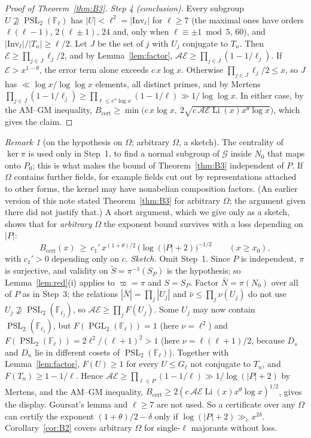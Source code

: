 \documentclass[11pt]{amsart}
\theoremstyle{definition}
\theoremstyle{remark}
\newtheorem{remark}[theorem]{Remark}
\newcommand{\F}{\mathbb{F}}
\DeclareMathOperator{\PGL}{PGL}
\DeclareMathOperator{\PSL}{PSL}
\DeclareMathOperator{\Li}{Li}
\newcommand{\Inv}{\mathrm{Inv}}
\newcommand{\cA}{\mathcal{A}}      %
\newcommand{\cE}{\mathcal{E}}      %
\newcommand{\cG}{\mathcal{G}}      %
\begin{document}
\begin{proof}[Proof of Theorem~\ref{thm:B3}]
\emph{Step 4 (conclusion).} Every subgroup $U\not\supseteq\PSL_2(\F_\ell)$ has $|U|<\ell^2=|\Inv_\ell|$ for $\ell\ge7$
(the maximal ones have orders $\ell(\ell-1)$, $2(\ell\pm1)$, $24$ and, only when $\ell\equiv\pm1\bmod5$, $60$), and $|\Inv_\ell|/|T_n|\ge\ell/2$. Let $J$
be the set of $j$ with $U_j$ conjugate to $T_n$. Then $\cE\ge\prod_{j\in J}\ell_j/2$, and by
Lemma~\ref{lem:factor}, $\cA\cE\ge\prod_{j\in J}(1-1/\ell_j)$. If $\cE>x^{1-\theta}$, the error term alone exceeds
$c\,x\log x$. Otherwise $\prod_{j\in J}\ell_j/2\le x$, so $J$ has $\ll\log x/\log\log x$ elements, all distinct primes,
and by Mertens $\prod_{j\in J}(1-1/\ell_j)\ge\prod_{\ell\le c''\log x}(1-1/\ell)\gg1/\log\log x$. In either case, by the
AM--GM inequality, $B_{\mathrm{cert}}\ge\min\bigl(c\,x\log x,\ 2\sqrt{c\,\cA\cE\Li(x)x^\theta\log x}\bigr)$, which gives
the claim.
\end{proof}

\begin{remark}[on the hypothesis on $\Omega$; arbitrary $\Omega$, a sketch]\label{rem:B3-omega}
The centrality of $\ker\pi$ is used only in Step~1, to find a normal subgroup of $\cG$ inside $N_0$ that maps onto
$P_0$; this is what makes the bound of Theorem~\ref{thm:B3} independent of $P$. If $\Omega$ contains further fields,
for example fields cut out by representations attached to other forms, the kernel may have nonabelian composition
factors. (An earlier version of this note stated Theorem~\ref{thm:B3} for arbitrary $\Omega$; the argument given there
did not justify that.) A short argument, which we give only as a sketch, shows that for \emph{arbitrary} $\Omega$ the
exponent bound survives with a loss depending on $|P|$:
\[
  B_{\mathrm{cert}}(x)\ \ge\ c_1'\,x^{(1+\theta)/2}\,\bigl(\log(|P|+2)\bigr)^{-1/2}\qquad(x\ge x_0),
\]
with $c_1'>0$ depending only on $c$. \emph{Sketch.} Omit Step~1. Since $P$ is independent, $\pi$ is surjective, and
validity on $\widetilde S=\pi^{-1}(S_P)$ is the hypothesis; so Lemma~\ref{lem:red}(i) applies to $\varpi=\pi$ and
$S=S_P$. Factor $\bar N=\pi(N_0)$ over all of $P$ as in Step~3; the relations $|\bar N|=\prod_j|U_j|$ and
$\bar\nu\le\prod_j\nu(U_j)$ do not use $U_j\not\supseteq\PSL_2(\F_{\ell_j})$, so $\cA\cE\ge\prod_jF(U_j)$. Some
$U_j$ may now contain $\PSL_2(\F_{\ell_j})$, but $F(\PGL_2(\F_\ell))=1$ (here $\nu=\ell^2$) and
$F(\PSL_2(\F_\ell))=2\ell^2/(\ell+1)^2>1$ (here $\nu=\ell(\ell+1)/2$, because $D_s$ and $D_n$ lie in different cosets
of $\PSL_2(\F_\ell)$). Together with Lemma~\ref{lem:factor}, $F(U)\ge1$ for every $U\le G_\ell$ not conjugate to
$T_n$, and $F(T_n)\ge1-1/\ell$. Hence $\cA\cE\ge\prod_{\ell\in P}(1-1/\ell)\gg1/\log(|P|+2)$ by Mertens, and the
AM--GM inequality, $B_{\mathrm{cert}}\ge2(c\,\cA\cE\Li(x)x^\theta\log x)^{1/2}$, gives the display. Goursat's lemma
and $\ell\ge7$ are not used. So a certificate over any $\Omega$ can certify the exponent $(1+\theta)/2-\delta$ only if
$\log(|P|+2)\gg_c x^{2\delta}$. Corollary~\ref{cor:B2} covers arbitrary $\Omega$ for single-$\ell$ majorants without
loss.
\end{remark}
\end{document}
